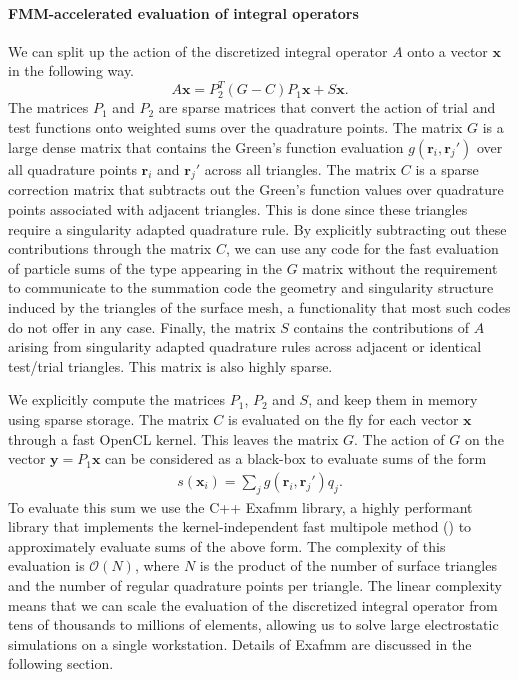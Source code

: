 \paragraph{FMM-accelerated evaluation of integral operators}
We can split up the action of the discretized integral operator $A$ onto a vector $\mathbf{x}$ in the following way.
\begin{equation}
\label{eq:bempp_fmm_matvec}
A\mathbf{x} = P_2^T (G - C)P_1 \mathbf{x} + S \mathbf{x}.
\end{equation}
The matrices $P_1$ and $P_2$ are sparse matrices that convert the action of trial and test functions onto weighted sums over the quadrature points.
The matrix $G$ is a large dense matrix that contains the Green's function evaluation $g(\mathbf{r}_i, \mathbf{r}_j')$ over all quadrature points $\mathbf{r}_i$ and $\mathbf{r}_j'$ across all triangles.
The matrix $C$ is a sparse correction matrix that subtracts out the Green's function values over quadrature points associated with  adjacent triangles.
This is done since these triangles require a singularity adapted quadrature rule.
By explicitly subtracting out these contributions through the matrix $C$, we can use any code for the fast evaluation of particle sums of the type appearing in the $G$ matrix without the requirement to communicate to the summation code the geometry and singularity structure induced by the triangles of the surface mesh, a functionality that most such codes do not offer in any case.
Finally, the matrix $S$ contains the contributions of $A$ arising from singularity adapted quadrature rules across adjacent or identical test/trial triangles.
This matrix is also highly sparse.

We explicitly compute the matrices $P_1$, $P_2$ and $S$, and keep them in memory using sparse storage.
The matrix $C$ is evaluated on the fly for each vector $\mathbf{x}$ through a fast OpenCL kernel.
This leaves the matrix $G$.
The action of $G$ on the vector $\mathbf{y}=P_1 \mathbf{x}$ can be considered as a black-box to evaluate sums of the form
%
\begin{align}\label{eq:nbody_sum}
s(\mathbf{x}_i) = \sum_j g(\mathbf{r}_i, \mathbf{r}_j')q_j.
\end{align}
%
To evaluate this sum we use the C++ Exafmm library, a highly performant library that implements the kernel-independent fast multipole method (\kifmm) to approximately evaluate sums of the above form.
The complexity of this evaluation is $\mathcal{O}(N)$, where $N$ is the product of the number of surface triangles and the number of regular quadrature points per triangle.
The linear complexity means that we can scale the evaluation of the discretized integral operator from tens of thousands to millions of elements, allowing us to solve large electrostatic simulations on a single workstation. Details of Exafmm are discussed in the following section.

